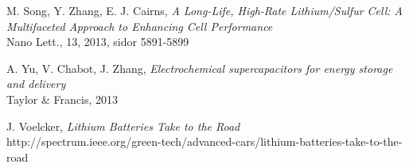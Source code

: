\documentclass[a4paper,12pt]{article}
\begin{document}
\begin{thebibliography}{9}
 M. Song, Y. Zhang, E. J. Cairns, \emph{A Long-Life, High-Rate Lithium/Sulfur Cell: A Multifaceted Approach to Enhancing Cell Performance} \\ Nano Lett., 13, 2013, sidor 5891-5899

 A. Yu, V. Chabot, J. Zhang, \emph{Electrochemical supercapacitors for energy storage and delivery} \\ Taylor \& Francis, 2013

 J. Voelcker, \emph{Lithium Batteries Take to the Road} \\
http://spectrum.ieee.org/green-tech/advanced-cars/lithium-batteries-take-to-the-road

\end{thebibliography}
\end{document}

